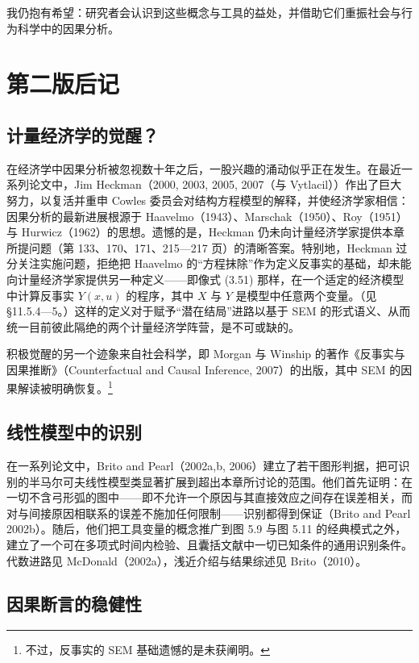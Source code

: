 我仍抱有希望：研究者会认识到这些概念与工具的益处，并借助它们重振社会与行为科学中的因果分析。

\section{第二版后记}

\subsection{计量经济学的觉醒？}

在经济学中因果分析被忽视数十年之后，一股兴趣的涌动似乎正在发生。在最近一系列论文中，Jim Heckman（2000, 2003, 2005, 2007（与 Vytlacil））作出了巨大努力，以复活并重申 Cowles 委员会对结构方程模型的解释，并使经济学家相信：因果分析的最新进展根源于 Haavelmo（1943）、Marschak（1950）、Roy（1951）与 Hurwicz（1962）的思想。遗憾的是，Heckman 仍未向计量经济学家提供本章所提问题（第 133、170、171、215—217 页）的清晰答案。特别地，Heckman 过分关注实施问题，拒绝把 Haavelmo 的“方程抹除”作为定义反事实的基础，却未能向计量经济学家提供另一种定义——即像式 \textup{(3.51)} 那样，在一个适定的经济模型中计算反事实 $Y(x,u)$ 的程序，其中 $X$ 与 $Y$ 是模型中任意两个变量。（见 \S 11.5.4—5。）这样的定义对于赋予“潜在结局”进路以基于 SEM 的形式语义、从而统一目前彼此隔绝的两个计量经济学阵营，是不可或缺的。

积极觉醒的另一个迹象来自社会科学，即 Morgan 与 Winship 的著作《反事实与因果推断》（Counterfactual and Causal Inference, 2007）的出版，其中 SEM 的因果解读被明确恢复。\footnote{不过，反事实的 SEM 基础遗憾的是未获阐明。}

\subsection{线性模型中的识别}

在一系列论文中，Brito and Pearl（2002a,b, 2006）建立了若干图形判据，把可识别的半马尔可夫线性模型类显著扩展到超出本章所讨论的范围。他们首先证明：在一切不含弓形弧的图中——即不允许一个原因与其直接效应之间存在误差相关，而对与间接原因相联系的误差不施加任何限制——识别都得到保证（Brito and Pearl 2002b）。随后，他们把工具变量的概念推广到图 5.9 与图 5.11 的经典模式之外，建立了一个可在多项式时间内检验、且囊括文献中一切已知条件的通用识别条件。代数进路见 McDonald（2002a），浅近介绍与结果综述见 Brito（2010）。

\subsection{因果断言的稳健性}


